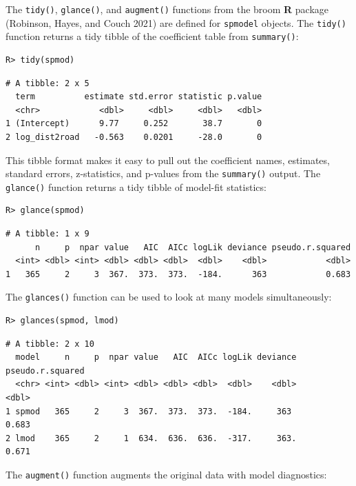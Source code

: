 \documentclass{article}
\begin{document}
The \texttt{tidy()}, \texttt{glance()}, and \texttt{augment()} functions
from the broom \textbf{\textsf{R}} package (Robinson, Hayes, and Couch
2021) are defined for \texttt{spmodel} objects. The \texttt{tidy()}
function returns a tidy tibble of the coefficient table from
\texttt{summary()}:

\begin{verbatim}
R> tidy(spmod)
\end{verbatim}

\begin{verbatim}
# A tibble: 2 x 5
  term          estimate std.error statistic p.value
  <chr>            <dbl>     <dbl>     <dbl>   <dbl>
1 (Intercept)      9.77     0.252       38.7       0
2 log_dist2road   -0.563    0.0201     -28.0       0
\end{verbatim}

This tibble format makes it easy to pull out the coefficient names,
estimates, standard errors, z-statistics, and p-values from the
\texttt{summary()} output. The \texttt{glance()} function returns a tidy
tibble of model-fit statistics:

\begin{verbatim}
R> glance(spmod)
\end{verbatim}

\begin{verbatim}
# A tibble: 1 x 9
      n     p  npar value   AIC  AICc logLik deviance pseudo.r.squared
  <int> <dbl> <int> <dbl> <dbl> <dbl>  <dbl>    <dbl>            <dbl>
1   365     2     3  367.  373.  373.  -184.      363            0.683
\end{verbatim}

The \texttt{glances()} function can be used to look at many models
simultaneously:

\begin{verbatim}
R> glances(spmod, lmod)
\end{verbatim}

\begin{verbatim}
# A tibble: 2 x 10
  model     n     p  npar value   AIC  AICc logLik deviance pseudo.r.squared
  <chr> <int> <dbl> <int> <dbl> <dbl> <dbl>  <dbl>    <dbl>            <dbl>
1 spmod   365     2     3  367.  373.  373.  -184.     363             0.683
2 lmod    365     2     1  634.  636.  636.  -317.     363.            0.671
\end{verbatim}

The \texttt{augment()} function augments the original data with model
diagnostics:
\end{document}
